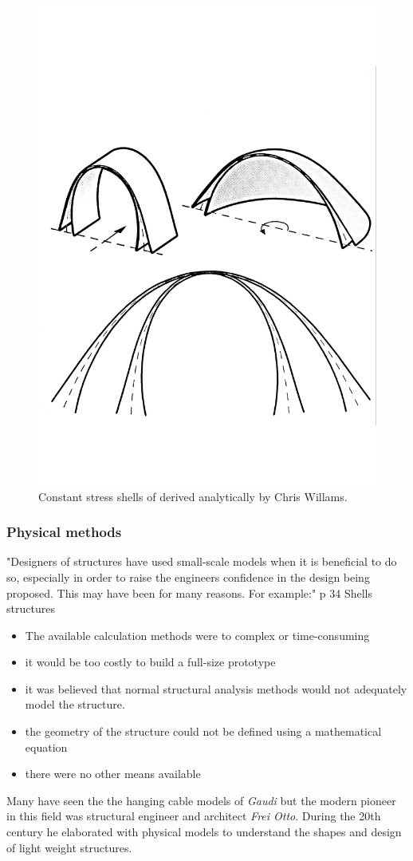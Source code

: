 \begin{figure}[H]
\centering
\includegraphics[width=0.6\linewidth ]{figure/Introduction/constantShell.pdf}
\caption{Constant stress shells of derived analytically by Chris Willams. }
\end{figure}


\subsubsection{Physical methods}

"Designers of structures have used small-scale models when it is beneficial to do so, especially in order to raise the engineers confidence in the design being proposed. This may have been for many reasons. For example:" p 34 Shells structures

\begin{itemize}
\item The available calculation methods were to complex or time-consuming
\item it would be too costly to build a full-size prototype
\item it was believed that normal structural analysis methods would not adequately model the structure.
\item the geometry of the structure could not be defined using a mathematical equation
\item there were no other means available
\end{itemize}


Many have seen the the hanging cable models of \textit{Gaudi} but the  modern pioneer in this field was structural engineer and architect \textit{Frei Otto}. During the 20th century he elaborated with physical models to understand the shapes and design of light weight structures.

